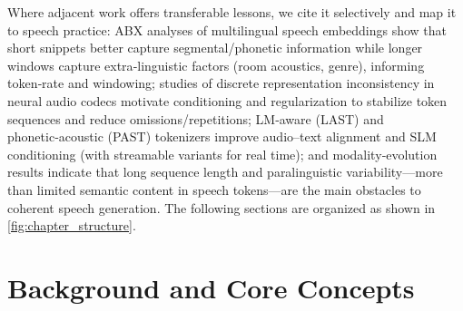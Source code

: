 \documentclass{article}
\begin{document}
Where adjacent work offers transferable lessons, we cite it selectively and map it to speech practice: ABX analyses of multilingual speech embeddings show that short snippets better capture segmental/phonetic information while longer windows capture extra‑linguistic factors (room acoustics, genre), informing token‑rate and windowing; studies of discrete representation inconsistency in neural audio codecs motivate conditioning and regularization to stabilize token sequences and reduce omissions/repetitions; LM‑aware (LAST) and phonetic‑acoustic (PAST) tokenizers improve audio–text alignment and SLM conditioning (with streamable variants for real time); and modality‑evolution results indicate that long sequence length and paralinguistic variability—more than limited semantic content in speech tokens—are the main obstacles to coherent speech generation. \cite{har-tuv2025pastphoneticacousticspeechtokenizer,turetzky2024lastlanguagemodelawarespeechtokenization,fily2024establishingdegreesclosenessbetweenaudio,wang2024whydospeechlanguagemodelsfailgeneratesem,liu2024analyzingmitigatinginconsistencydiscrete}The following sections are organized as shown in \autoref{fig:chapter_structure}.

















\section{Background and Core Concepts} \label{sec:Background and Core Concepts}
\end{document}
